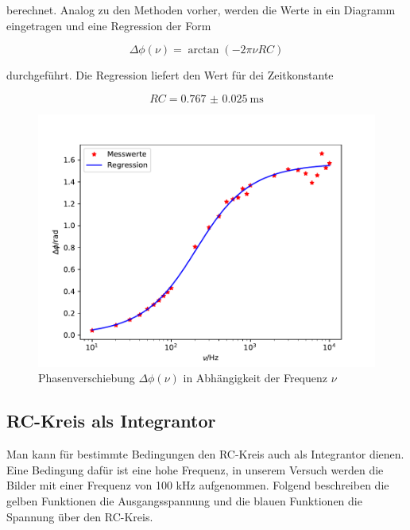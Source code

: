 berechnet. Analog zu den Methoden vorher, werden die Werte in ein Diagramm eingetragen und eine
Regression der Form

\begin{equation*}
  \Delta\phi(\nu) = \arctan (-2 \pi \nu RC)
\end{equation*}

durchgeführt. Die Regression liefert den Wert für dei Zeitkonstante

\begin{equation*}
  RC = \SI{0.767(25)}{\milli\second}
\end{equation*}

\begin{figure}
  \centering
  \includegraphics[scale = 0.7]{plotC.pdf}
  \caption{Phasenverschiebung $\Delta\phi (\nu)$ in Abhängigkeit der Frequenz $\nu$}
  \label{Plot3}
\end{figure}

\subsection{RC-Kreis als Integrantor}

Man kann für bestimmte Bedingungen den RC-Kreis auch als Integrantor dienen. Eine Bedingung dafür
ist eine hohe Frequenz, in unserem Versuch werden die Bilder mit einer Frequenz von 100 kHz
aufgenommen. Folgend beschreiben die gelben Funktionen die Ausgangsspannung und die blauen Funktionen
die Spannung über den RC-Kreis.

